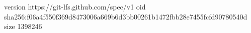 version https://git-lfs.github.com/spec/v1
oid sha256:f06a4f550f369d8473006a669b6d3bb00261b1472fbb28e7455fcfd90780540d
size 1398246
